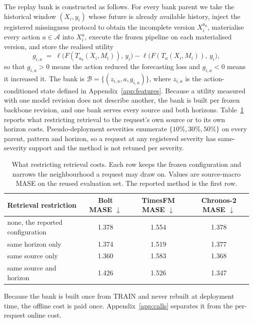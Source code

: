 \documentclass{article}
\newcommand{\calA}{\mathcal{A}}
\newcommand{\calB}{\mathcal{B}}
\newcommand{\loss}{\ell}
\begin{document}
The replay bank is constructed as follows. For every bank parent we take the historical
window $(X_i, y_i)$ whose future is already available history, inject the registered
missingness protocol to obtain the incomplete version $X_i^{a_0}$, materialise every action
$a \in \calA$ into $X_i^{a}$, execute the frozen pipeline on each materialised version, and
store the realised utility
\begin{equation}
  g_{i,a} \;=\; \loss\big(F(T_{a_0}(X_i, M_i)),\, y_i\big) - \loss\big(F(T_{a}(X_i, M_i)),\, y_i\big),
  \label{eq:app-gain}
\end{equation}
so that $g_{i,a} > 0$ means the action reduced the forecasting loss and $g_{i,a} < 0$ means it
increased it. The bank is
$\calB = \{(z_{i,a}, a, g_{i,a})\}$, where $z_{i,a}$ is the action-conditioned state defined
in Appendix~\ref{app:features}. Because a utility measured with one model revision does not describe another, the bank is
built per frozen backbone revision, and one bank serves every source and both horizons.
Table~\ref{tab:app-retrieval} reports what restricting retrieval to the request's own source
or to its own horizon costs. Pseudo-deployment severities enumerate
$\{10\%, 30\%, 50\%\}$ on every parent, pattern and horizon, so a request at any registered
severity has same-severity support and the method is not retuned per severity.

\begin{table}[htbp]
  \caption{What restricting retrieval costs. Each row keeps the frozen configuration and
  narrows the neighbourhood a request may draw on. Values are source-macro MASE on the
  reused evaluation set. The reported method is the first row.}
  \label{tab:app-retrieval}
  \centering
  \small
  \setlength{\tabcolsep}{4pt}
\begin{tabular}{lccc}
    \toprule
    Retrieval restriction & Bolt MASE $\downarrow$ & TimesFM MASE $\downarrow$ & Chronos-2 MASE $\downarrow$ \\
    \midrule
    none, the reported configuration & 1.378 & 1.554 & 1.378 \\
    same horizon only                & 1.374   & 1.519   & 1.377 \\
    same source only                 & 1.360  & 1.583  & 1.368 \\
    same source and horizon          & 1.426 & 1.526 & 1.347 \\
    \bottomrule
  \end{tabular}
\end{table}
Because the bank is built once from TRAIN and never rebuilt at deployment time, the offline
cost is paid once. Appendix~\ref{app:calls} separates it from the per-request online cost.
\end{document}
